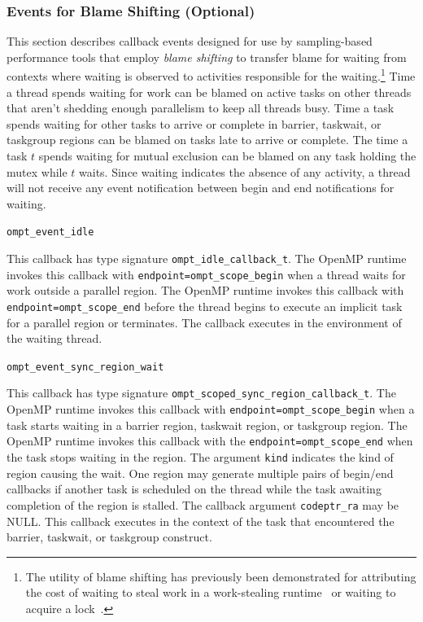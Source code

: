 \documentclass{article}
\begin{document}
\subsubsection{Events for Blame Shifting (Optional)}
\label{sec:blame}
This section describes callback events designed for use by sampling-based performance tools 
that employ {\em blame shifting} to transfer blame for waiting from contexts 
where waiting is observed to activities responsible for the waiting.\footnote{The utility of blame shifting has previously been demonstrated for attributing the cost of waiting to steal work 
in a work-stealing runtime~\cite{Tallent:PPoPP09} or waiting to acquire a lock~\cite{Tallent:PPoPP10}.}
Time a thread spends waiting for work can be blamed on active tasks on other threads that aren't shedding enough parallelism to keep all threads busy. 
Time a task spends waiting for other tasks to arrive or complete in barrier, taskwait, or taskgroup regions can be blamed on tasks late to arrive or complete.
The time a task $t$ spends waiting for mutual exclusion can be blamed on any task holding the mutex while $t$ waits.
Since waiting indicates the absence of any activity, a thread will not receive any event notification between begin and end notifications for waiting.

\begin{description}

\item \verb|ompt_event_idle|

  \sloppy
  This callback has type signature \verb|ompt_idle_callback_t|. 
  The OpenMP runtime invokes this callback with \verb|endpoint=|\verb|ompt_scope_begin| when a thread waits for work outside a parallel region.
  The OpenMP runtime invokes this callback with \verb|endpoint=|\verb|ompt_scope_end| before the thread  begins to execute an implicit task for
   a parallel region or terminates. The callback executes in the environment of the waiting thread.  

\end{description}

\begin{description}

\item \verb|ompt_event_sync_region_wait|

  This callback has type signature \verb|ompt_scoped_sync_region_callback_t|. 
  The OpenMP runtime invokes this callback with \verb|endpoint=|\verb|ompt_scope_begin| when a task starts waiting in a barrier region, taskwait region, or taskgroup region.
   The OpenMP runtime invokes this callback with the \verb|endpoint=|\verb|ompt_scope_end| when the task stops waiting in the region.
   The argument \verb|kind| indicates the kind of region causing the wait. 
   One region may generate multiple pairs of begin/end callbacks if another task is scheduled on the thread while the task awaiting completion of the region is stalled.
   The callback argument \verb|codeptr_ra| may be NULL.
   This callback executes in the context of the task that encountered the barrier, taskwait, or taskgroup construct. 
   
\end{description}
\end{document}
